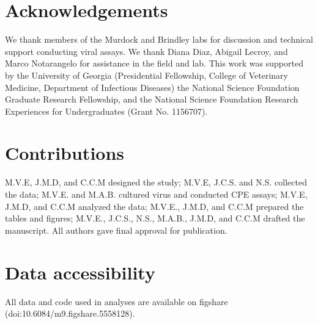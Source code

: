 \documentclass[12pt]{article}
\begin{document}
\section{Acknowledgements}
We thank members of the Murdock and Brindley labs for discussion and technical support conducting viral assays. We thank Diana Diaz, Abigail Lecroy, and Marco Notarangelo for assistance in the field and lab. This work was supported by the University of Georgia (Presidential Fellowship, College of Veterinary Medicine, Department of Infectious Diseases) the National Science Foundation Graduate Research Fellowship, and the National Science Foundation Research Experiences for Undergraduates (Grant No. 1156707).

\section{Contributions}
M.V.E, J.M.D, and C.C.M designed the study; M.V.E, J.C.S. and N.S. collected the data; M.V.E. and M.A.B. cultured virus and conducted CPE assays; M.V.E, J.M.D, and C.C.M analyzed the data; M.V.E., J.M.D, and C.C.M prepared the tables and figures; M.V.E., J.C.S., N.S., M.A.B., J.M.D, and C.C.M drafted the manuscript. All authors gave final approval for publication.

\section{Data accessibility}
All data and code used in analyses are available on figshare (doi:10.6084/m9.figshare.5558128).

\newpage



\end{document}

